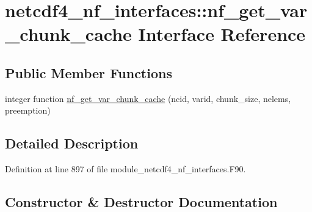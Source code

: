 \hypertarget{interfacenetcdf4__nf__interfaces_1_1nf__get__var__chunk__cache}{}\section{netcdf4\+\_\+nf\+\_\+interfaces\+:\+:nf\+\_\+get\+\_\+var\+\_\+chunk\+\_\+cache Interface Reference}
\label{interfacenetcdf4__nf__interfaces_1_1nf__get__var__chunk__cache}
\subsection*{Public Member Functions}
\begin{DoxyCompactItemize}
\item 
integer function \hyperlink{interfacenetcdf4__nf__interfaces_1_1nf__get__var__chunk__cache_ad62159433053cca532e1aec503f5ff2c}{nf\+\_\+get\+\_\+var\+\_\+chunk\+\_\+cache} (ncid, varid, chunk\+\_\+size, nelems, preemption)
\end{DoxyCompactItemize}


\subsection{Detailed Description}


Definition at line 897 of file module\+\_\+netcdf4\+\_\+nf\+\_\+interfaces.\+F90.



\subsection{Constructor \& Destructor Documentation}
\mbox{\label{interfacenetcdf4__nf__interfaces_1_1nf__get__var__chunk__cache_ad62159433053cca532e1aec503f5ff2c}} 
